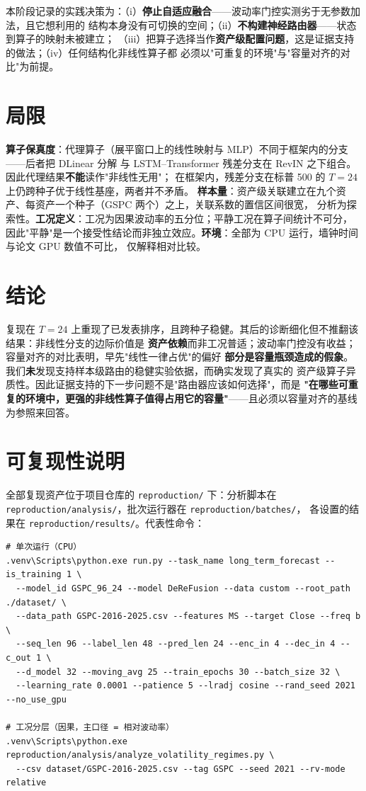 \documentclass[preprint,12pt]{elsarticle}
\begin{document}
本阶段记录的实践决策为：（i）\textbf{停止自适应融合}——波动率门控实测劣于无参数加法，且它想利用的
结构本身没有可切换的空间；（ii）\textbf{不构建神经路由器}——状态到算子的映射未被建立；
（iii）把算子选择当作\textbf{资产级配置问题}，这是证据支持的做法；（iv）任何结构化非线性算子都
必须以"可重复的环境"与"容量对齐的对比"为前提。

\section{局限}
\label{sec:limitations}

\textbf{算子保真度}：代理算子（展平窗口上的线性映射与 MLP）不同于框架内的分支——后者把 DLinear 分解
与 LSTM--Transformer 残差分支在 RevIN 之下组合。因此代理结果\textbf{不能}读作"非线性无用"；
在框架内，残差分支在标普 500 的 $T=24$ 上仍跨种子优于线性基座，两者并不矛盾。
\textbf{样本量}：资产级关联建立在九个资产、每资产一个种子（GSPC 两个）之上，关联系数的置信区间很宽，
分析为探索性。\textbf{工况定义}：工况为因果波动率的五分位；平静工况在算子间统计不可分，
因此"平静"是一个接受性结论而非独立效应。\textbf{环境}：全部为 CPU 运行，墙钟时间与论文 GPU 数值不可比，
仅解释相对比较。

\section{结论}
\label{sec:conclusion}

复现在 $T=24$ 上重现了已发表排序，且跨种子稳健。其后的诊断细化但不推翻该结果：非线性分支的边际价值是
\textbf{资产依赖}而非工况普适；波动率门控没有收益；容量对齐的对比表明，早先"线性一律占优"的偏好
\textbf{部分是容量瓶颈造成的假象}。我们\textbf{未}发现支持样本级路由的稳健实验依据，而确实发现了真实的
资产级算子异质性。因此证据支持的下一步问题不是"路由器应该如何选择"，而是
\textbf{"在哪些可重复的环境中，更强的非线性算子值得占用它的容量"}——且必须以容量对齐的基线为参照来回答。

\appendix
\section{可复现性说明}
\label{app:repro}

全部复现资产位于项目仓库的 \texttt{reproduction/} 下：分析脚本在
\texttt{reproduction/analysis/}，批次运行器在 \texttt{reproduction/batches/}，
各设置的结果在 \texttt{reproduction/results/}。代表性命令：

\begin{verbatim}
# 单次运行（CPU）
.venv\Scripts\python.exe run.py --task_name long_term_forecast --is_training 1 \
  --model_id GSPC_96_24 --model DeReFusion --data custom --root_path ./dataset/ \
  --data_path GSPC-2016-2025.csv --features MS --target Close --freq b \
  --seq_len 96 --label_len 48 --pred_len 24 --enc_in 4 --dec_in 4 --c_out 1 \
  --d_model 32 --moving_avg 25 --train_epochs 30 --batch_size 32 \
  --learning_rate 0.0001 --patience 5 --lradj cosine --rand_seed 2021 --no_use_gpu

# 工况分层（因果，主口径 = 相对波动率）
.venv\Scripts\python.exe reproduction/analysis/analyze_volatility_regimes.py \
  --csv dataset/GSPC-2016-2025.csv --tag GSPC --seed 2021 --rv-mode relative
\end{verbatim}
\end{document}

